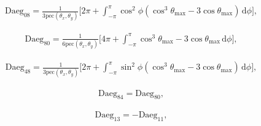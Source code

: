 \documentclass[a4paper,11pt,twoside,openright]{book}
\providecommand{\pec}{{\mathrm{pec}}}%
\def\lthtmlcheckvsize{\ifdim\ht\sizebox<\vsize 
  \ifdim\wd\sizebox<\hsize\expandafter\hfill\fi \expandafter\vfill
  \else\expandafter\vss\fi}%
\begin{document}
{\newpage\clearpage
\setcounter{equation}{63}
%
\begin{subequations}\begin{flalign}
&\textrm{Daeg}_{08} = \frac{1}{3\pec (\theta_x , \theta_y )} \Bigg[
2\pi +
\int_{-\pi}^{\pi}
\cos^2\phi \left( \cos^3\theta_{\textrm{max}}- 3\cos\theta_{\textrm{max}}\right)
\,\mathrm{d}\phi
\Bigg] , &
\end{flalign}\end{subequations}%
\lthtmldisplayZ
\lthtmlcheckvsize\clearpage}

{\newpage\clearpage
\setcounter{equation}{63}
%
\begin{subequations}\begin{flalign}
&\textrm{Daeg}_{80} = \frac{1}{6\pec (\theta_x , \theta_y )} \Bigg[
4\pi +
\int_{-\pi}^{\pi}
\cos^3\theta_{\textrm{max}}- 3\cos\theta_{\textrm{max}}
\,\mathrm{d}\phi
\Bigg] , &
\end{flalign}\end{subequations}%
\lthtmldisplayZ
\lthtmlcheckvsize\clearpage}

{\newpage\clearpage
\setcounter{equation}{63}
%
\begin{subequations}\begin{flalign}
&\textrm{Daeg}_{48} = \frac{1}{3\pec (\theta_x , \theta_y )} \Bigg[
2\pi +
\int_{-\pi}^{\pi}
\sin^2\phi \left( \cos^3\theta_{\textrm{max}}- 3\cos\theta_{\textrm{max}}\right)
\,\mathrm{d}\phi
\Bigg] , &
\end{flalign}\end{subequations}%
\lthtmldisplayZ
\lthtmlcheckvsize\clearpage}

{\newpage\clearpage
\setcounter{equation}{63}
%
\begin{subequations}\begin{flalign}
&\textrm{Daeg}_{84} = \textrm{Daeg}_{80} , &
\end{flalign}\end{subequations}%
\lthtmldisplayZ
\lthtmlcheckvsize\clearpage}

{\newpage\clearpage
\setcounter{equation}{63}
%
\begin{subequations}\begin{flalign}
&\textrm{Daeg}_{13} = -\textrm{Daeg}_{11} , &
\end{flalign}\end{subequations}%
\lthtmldisplayZ
\lthtmlcheckvsize\clearpage}
\end{document}
